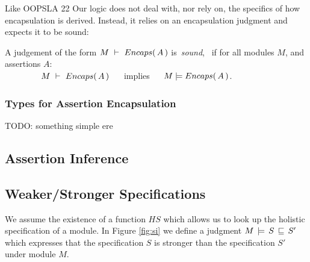 Like OOPSLA 22 Our logic does not {deal with, nor} rely on, the specifics of  how   encapsulation
{is derived}.
{Instead, it relies} on an encapsulation judgment and expects it to be sound:

\begin{definition}
\label{lem:encap-soundness}
A judgement of the form $M\ \vdash\ {Encaps(\, A\, )}$  is\  \emph{sound}, \ if 
for all modules $M$, and assertions $A$:\\

$\strut \hspace{1.5cm} M\ \vdash\ {Encaps(\, A\, )} \ \ \ \ $ implies $\ \ \ \ \satisfies{M}{\encaps{A}}$.
\end{definition}




\subsubsection{Types for Assertion Encapsulation}
\label{types}
TODO: something simple ere 

\subsection{Assertion Inference}




\subsection{Weaker/Stronger Specifications}

We assume   the existence of a function $HS$ which allows us to look up the holistic specification of a module. 
In Figure \ref{fig:si} we   define a judgment $M\, \models\, S\, \sqsubseteq\, S'$ which expresses that the specification $S$ is stronger than the specification $S'$ under module $M$.  

